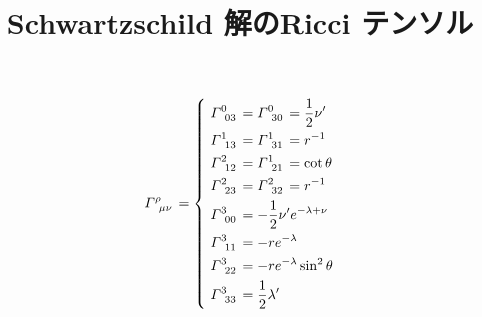 \documentclass{jsarticle}
\title{Schwartzschild 解のRicci テンソル}
\author{}
\begin{document}
    \maketitle


\begin{equation}
   \tensor{\varGamma}{^\rho_{\mu\nu}} = 
    \left\{  \
        \begin{aligned}
            &\tensor{\varGamma}{^0_{03}} = \tensor{\varGamma}{^0_{30}} = \frac{1}{2} \nu'\\
            &\tensor{\varGamma}{^1_{13}} = \tensor{\varGamma}{^1_{31}} = r^{-1}\\
            &\tensor{\varGamma}{^2_{12}} = \tensor{\varGamma}{^1_{21}} = \cot\theta\\
            &\tensor{\varGamma}{^2_{23}} = \tensor{\varGamma}{^2_{32}} = r^{-1}\\
            &\tensor{\varGamma}{^3_{00}} = -\frac{1}{2} \nu'e^{-\lambda + \nu}\\ 
            &\tensor{\varGamma}{^3_{11}} = -re^{-\lambda}\\
            &\tensor{\varGamma}{^3_{22}} = -re^{-\lambda}\sin^2\theta\\
            &\tensor{\varGamma}{^3_{33}} = \frac{1}{2} \lambda'
        \end{aligned}
    \right. 
\end{equation}
\end{document}
